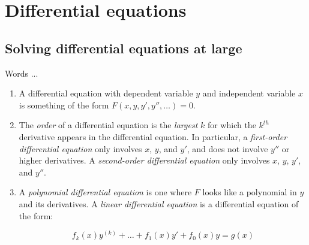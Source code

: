 \documentclass[10pt]{amsart}
\begin{document}
\section{Differential equations}

\subsection{Solving differential equations at large}

Words ...

\begin{enumerate}
\item A differential equation with dependent variable $y$ and
  independent variable $x$ is something of the form
  $F(x,y,y',y'',\dots) = 0$.
\item The {\em order} of a differential equation is the {\em largest}
  $k$ for which the $k^{th}$ derivative appears in the differential
  equation. In particular, a {\em first-order differential equation}
  only involves $x$, $y$, and $y'$, and does not involve $y''$ or
  higher derivatives. A {\em second-order differential equation} only
  involves $x$, $y$, $y'$, and $y''$.
\item A {\em polynomial differential equation} is one where $F$ looks
  like a polynomial in $y$ and its derivatives. A {\em linear
  differential equation} is a differential equation of the form:

  $$f_k(x)y^{(k)} + \dots + f_1(x)y' + f_0(x)y = g(x)$$


\end{enumerate}
\end{document}
